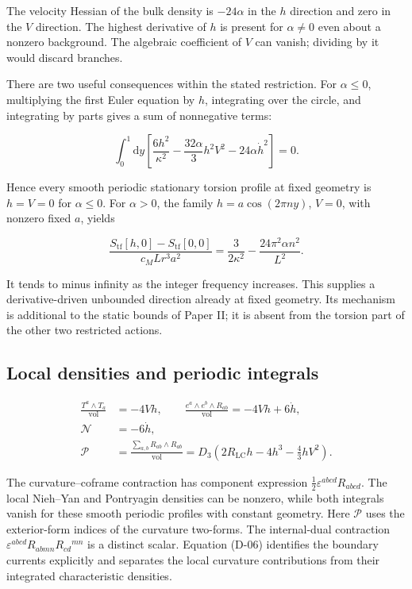 The velocity Hessian of the bulk density is $-24\alpha$ in the $h$ direction and zero in the $V$ direction. The highest derivative of $h$ is present for $\alpha\ne0$ even about a nonzero background. The algebraic coefficient of $V$ can vanish; dividing by it would discard branches.

There are two useful consequences within the stated restriction. For $\alpha\le0$, multiplying the first Euler equation by $h$, integrating over the circle, and integrating by parts gives a sum of nonnegative terms:

\begin{equation}\tag{D-04}\label{eq:D-04}
\int_0^1\!\mathrm{d}y\left[
\frac{6h^2}{\kappa^2}-\frac{32\alpha}{3}h^2V^2-24\alpha\dot h^2\right]=0.
\end{equation}

Hence every smooth periodic stationary torsion profile at fixed geometry is $h=V=0$ for $\alpha\le0$. For $\alpha>0$, the family $h=a\cos(2\pi n y)$, $V=0$, with nonzero fixed $a$, yields

\begin{equation}\tag{D-05}\label{eq:D-05}
\frac{S_{\mathrm{tf}}[h,0]-S_{\mathrm{tf}}[0,0]}{c_M Lr^3 a^2}
=\frac{3}{2\kappa^2}-\frac{24\pi^2\alpha n^2}{L^2}.
\end{equation}

It tends to minus infinity as the integer frequency increases. This supplies a derivative-driven unbounded direction already at fixed geometry. Its mechanism is additional to the static bounds of Paper II; it is absent from the torsion part of the other two restricted actions.

\subsection{Local densities and periodic integrals}

\begin{equation}\tag{D-06}\label{eq:D-06}
\begin{aligned}
\frac{T^a\wedge T_a}{\mathrm{vol}}&=-4Vh,\qquad
\frac{e^a\wedge e^b\wedge R_{ab}}{\mathrm{vol}}=-4Vh+6\dot h,\\
\mathcal N&=-6\dot h,\\
\mathcal P&=\frac{\sum_{a,b}R_{ab}\wedge R_{ab}}{\mathrm{vol}}
=D_3\left(2R_{\mathrm{LC}}h-4h^3-\frac43hV^2\right).
\end{aligned}
\end{equation}

The curvature--coframe contraction has component expression $\tfrac12\varepsilon^{abcd}R_{abcd}$. The local Nieh--Yan and Pontryagin densities can be nonzero, while both integrals vanish for these smooth periodic profiles with constant geometry. Here $\mathcal P$ uses the exterior-form indices of the curvature two-forms. The internal-dual contraction $\varepsilon^{abcd}R_{abmn}R_{cd}{}^{mn}$ is a distinct scalar. Equation (D-06) identifies the boundary currents explicitly and separates the local curvature contributions from their integrated characteristic densities.


